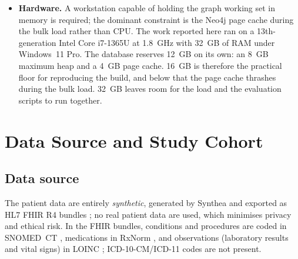 \begin{itemize}
    retrieved facts. The choice of model affects only the phrasing: retrieval is
    deterministic and completes before any model is called, so the facts a briefing may
    contain are fixed before generation begins.
    \item \textbf{Hardware.} A workstation capable of holding the graph working set in
    memory is required; the dominant constraint is the Neo4j page cache during the bulk
    load rather than CPU.
    The work reported here ran on a 13th-generation Intel Core i7-1365U at 1.8~GHz with
    32~GB of RAM under Windows~11 Pro. The database reserves 12~GB on its own: an
    8~GB maximum heap and a 4~GB page cache. 16~GB is therefore the practical floor for
    reproducing the build, and below that the page cache thrashes during the bulk load.
    32~GB leaves room for the load and the evaluation scripts to run together.
\end{itemize}

\section{Data Source and Study Cohort}
\label{sec:data-source}

\subsection{Data source}
The patient data are entirely \emph{synthetic}, generated by Synthea \cite{synthea} and
exported as HL7 FHIR R4 bundles \cite{fhir_r4}; no real patient data are used, which
minimises privacy and ethical risk. In the FHIR bundles, conditions and procedures are
coded in SNOMED~CT \cite{snomedct}, medications in RxNorm \cite{rxnorm}, and observations
(laboratory results and vital signs) in LOINC \cite{loinc}; ICD-10-CM/ICD-11 codes are not
present.

